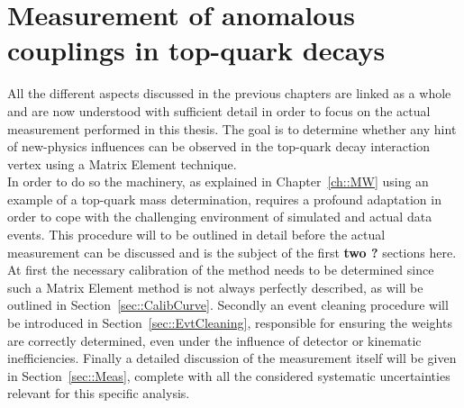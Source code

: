\chapter{Measurement of anomalous couplings in top-quark decays} \label{ch::Analysis}

All the different aspects discussed in the previous chapters are linked as a whole and are now understood with sufficient detail in order to focus on the actual measurement performed in this thesis.
The goal is to determine whether any hint of new-physics influences can be observed in the top-quark decay interaction vertex using a Matrix Element technique.
\\

In order to do so the machinery, as explained in Chapter~\ref{ch::MW} using an example of a top-quark mass determination, requires a profound adaptation in order to cope with the challenging environment of simulated and actual data events. This procedure will to be outlined in detail before the actual measurement can be discussed and is the subject of the first \textbf{two ?} sections here.
At first the necessary calibration of the method needs to be determined since such a Matrix Element method is not always perfectly described, as will be outlined in Section~\ref{sec::CalibCurve}.
Secondly an event cleaning procedure will be introduced in Section~\ref{sec::EvtCleaning}, responsible for ensuring the weights are correctly determined, even under the influence of detector or kinematic inefficiencies.
Finally a detailed discussion of the measurement itself will be given in Section~\ref{sec::Meas}, complete with all the considered systematic uncertainties relevant for this specific analysis.


